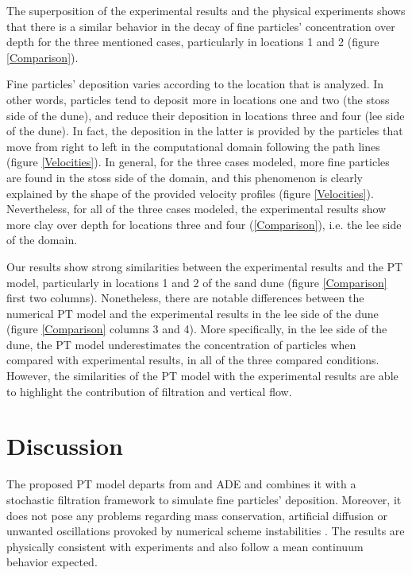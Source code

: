 \documentclass[draft,linenumbers]{agujournal2018}
\begin{document}
The superposition of the experimental results and the physical experiments shows that there is a similar behavior in the decay of fine particles' concentration over depth for the three mentioned cases, particularly in locations 1 and 2 (figure \ref{Comparison}).  

Fine particles' deposition varies according to the location that is analyzed. In other words, particles tend to deposit more in locations one and two (the stoss side of the dune), and reduce their deposition in locations three and four (lee side of the dune). In fact, the deposition in the latter is provided by the particles that move from right to left in the computational domain following the path lines (figure \ref{Velocities}). In general, for the three cases modeled, more fine particles are found in the stoss side of the domain, and this phenomenon is clearly explained by the shape of the provided velocity profiles (figure \ref{Velocities}). Nevertheless, for all of the three cases modeled, the experimental results show more clay over depth for locations three and four (\ref{Comparison}), i.e. the lee side of the domain. 

Our results show strong similarities between the experimental results and the PT model, particularly in locations 1 and 2 of the sand dune (figure \ref{Comparison} first two columns). Nonetheless, there are notable differences between the numerical PT model and the experimental results in the lee side of the dune (figure \ref{Comparison} columns 3 and 4). More specifically, in the lee side of the dune, the PT model underestimates the concentration of particles when compared with experimental results, in all of the three compared conditions. However, the similarities of the PT model with the experimental results are able to highlight the contribution of filtration and vertical flow. 

\section{Discussion} \label{Discussion}

The proposed PT model departs from and ADE and combines it with a stochastic filtration framework \citep{Li2017} to simulate fine particles' deposition. Moreover, it does not pose any problems regarding mass conservation, artificial diffusion or unwanted oscillations provoked by numerical scheme instabilities \citep{Delay2005}. The results are physically consistent with experiments and also follow a mean continuum behavior expected.
\end{document}
